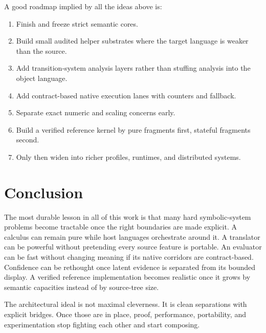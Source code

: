 \documentclass[11pt]{article}
\begin{document}
A good roadmap implied by all the ideas above is:

\begin{enumerate}
    \item Finish and freeze strict semantic cores.
    \item Build small audited helper substrates where the target language is weaker than the source.
    \item Add transition-system analysis layers rather than stuffing analysis into the object language.
    \item Add contract-based native execution lanes with counters and fallback.
    \item Separate exact numeric and scaling concerns early.
    \item Build a verified reference kernel by pure fragments first, stateful fragments second.
    \item Only then widen into richer profiles, runtimes, and distributed systems.
\end{enumerate}

\section*{Conclusion}

The most durable lesson in all of this work is that many hard symbolic-system problems become tractable once the right boundaries are made explicit. A calculus can remain pure while host languages orchestrate around it. A translator can be powerful without pretending every source feature is portable. An evaluator can be fast without changing meaning if its native corridors are contract-based. Confidence can be rethought once latent evidence is separated from its bounded display. A verified reference implementation becomes realistic once it grows by semantic capacities instead of by source-tree size.

The architectural ideal is not maximal cleverness. It is clean separations with explicit bridges. Once those are in place, proof, performance, portability, and experimentation stop fighting each other and start composing.
\end{document}
